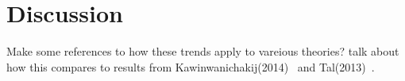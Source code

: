 \documentclass[apj]{emulateapj}
\begin{document}
\section{Discussion}

Make some references to how these trends apply to vareious theories? talk about how this compares to results from Kawinwanichakij(2014)~\cite{2014ApJ...792..103K} and Tal(2013)~\cite{2013ApJ...769...31T}.


\acknowledgements

\appendix



\end{document}
